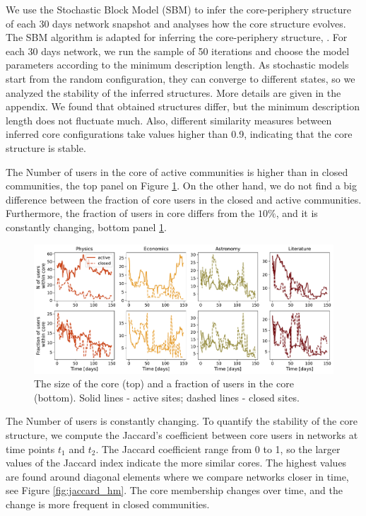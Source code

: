 We use the Stochastic Block Model (SBM) to infer the core-periphery structure of each 30 days network snapshot and analyses how the core structure evolves. The  SBM algorithm is adapted for inferring the core-periphery structure, \cite{gallagher2020clarified}. For each 30 days network, we run the sample of 50 iterations and choose the model parameters according to the minimum description length. As stochastic models start from the random configuration, they can converge to different states, so we analyzed the stability of the inferred structures. More details are given in the appendix. We found that obtained structures differ, but the minimum description length does not fluctuate much. Also, different similarity measures between inferred core configurations take values higher than 0.9, indicating that the core structure is stable. 

The Number of users in the core of active communities is higher than in closed communities, the top panel on Figure \ref{fig:core_size}. On the other hand, we do not find a big difference between the fraction of core users in the closed and active communities. Furthermore, the fraction of users in core differs from the $10\%$, and it is constantly changing, bottom panel \ref{fig:core_size}. 

\begin{figure}[h!]
	\centering
	\includegraphics[width=\linewidth]{figures/stackexchange/core_users.pdf}
	\caption[The size of the core]{The size of the core (top) and a fraction of users in the core (bottom). Solid lines - active sites; dashed lines - closed sites.}
	\label{fig:core_size}
\end{figure}

The Number of users is constantly changing. To quantify the stability of the core structure, we compute the Jaccard’s coefficient between core users in networks at time points $t_1$ and $t_2$. The Jaccard coefficient range from 0 to 1, so the larger values of the Jaccard index indicate the more similar cores. 
The highest values are found around diagonal elements where we compare networks closer in time, see Figure \ref{fig:jaccard_hm}. The core membership changes over time, and the change is more frequent in closed communities. 

